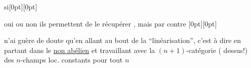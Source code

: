 si\raisebox{0pt}[0pt][0pt]{\parbox{0pt}{}} oui ou non ils permettent de le récupérer , mais par contre%
\raisebox{0pt}[0pt][0pt]{\parbox{0pt}{}}
n'ai guère de doute qu'en allant au bout de la ``linéarisation'', c'est à dire en partant dans le
\uline{non abélien} et travaillant avec la $(n+1)$-catégorie (   dessus!) des $n$-champs loc. constants
 pour tout $n$
